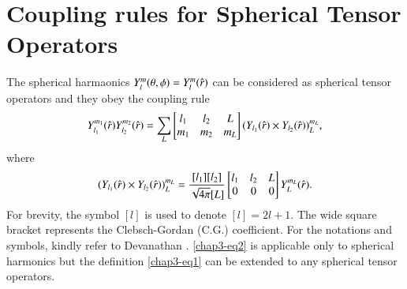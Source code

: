 \section{Coupling rules for Spherical Tensor Operators} \label{chap3-sec2}

The spherical harmaonics $Y^m_l(\theta, \phi)= Y_l^m (\hat{{\boldmath  r}})$ can be considered as spherical tensor operators and they obey the coupling rule
\begin{equation}
Y_{l_1}^{m_1} (\hat{{\boldmath  r}}) Y_{l_2}^{m_2} (\hat{{\boldmath  r}}) = \sum_L 
	\begin{bmatrix}
		l_1 & l_2 & L\\
		m_1 &m_2  & m_L
	\end{bmatrix}
(Y_{l_1} (\hat{{\boldmath  r}}) \times Y_{l_2} (\hat{{\boldmath  r}}))^{m_L}_{L}, \label{chap3-eq1}
\end{equation}
where
\begin{equation}
(Y_{l_1}  (\hat{{\boldmath  r}})  \times Y_{l_2} (\hat{{\boldmath  r}}) )^{m_L}_{L} = \frac{[l_1][l_2]}{\sqrt{4\pi}[L]}
\begin{bmatrix}
l_1 & l_2 & L\\
0 & 0 & 0
\end{bmatrix}
Y_{L}^{m_L} (\hat{{\boldmath  r}}). \label{chap3-eq2} 
\end{equation}
For brevity, the symbol $[l]$ is used to denote $[l] = 2l + 1$. The wide square bracket represents the Clebsch-Gordan (C.G.) coefficient. For the notations and symbols, kindly refer to Devanathan \cite{key11,key12}. \eqref{chap3-eq2} is applicable only to spherical harmonics but the definition \eqref{chap3-eq1} can be extended to any spherical tensor operators.

